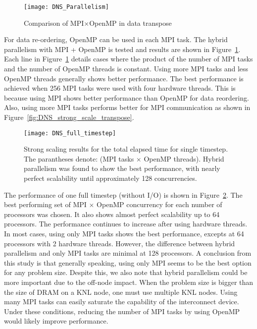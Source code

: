\begin{figure}
 \begin{center}
   \texttt{[image: DNS\_Parallelism]}
   \caption{Comparison of MPI$\times$OpenMP in data transpose}
   \label{fig:DNS_MPI_OpenMP}
 \end{center}
\end{figure}


For data re-ordering, OpenMP can be used in each MPI task. The hybrid parallelism with MPI + OpenMP
is tested and results are shown in Figure~\ref{fig:DNS_MPI_OpenMP}. 
Each line in Figure~\ref{fig:DNS_MPI_OpenMP} details cases where the product of
the number of MPI tasks and the number of OpenMP threads is
constant. Using more MPI tasks and less OpenMP threads generally shows
better performance. The best performance is achieved when 256 MPI tasks
were used with four hardware threads. This is because using MPI shows
better performance than OpenMP for data reordering. Also, using more MPI
tasks performs better for MPI communication as shown in
Figure~\ref{fig:DNS_strong_scale_transpose}. 


\begin{figure}
 \begin{center}
   \texttt{[image: DNS\_full\_timestep]}
   \caption{Strong scaling results for the total elapsed time for single timestep. The parantheses denote: (MPI tasks $\times$ OpenMP threads). Hybrid parallelism was found to show the best performance, with nearly perfect scalability until approximately 128 concurrencies.}
   \label{fig:DNS_strong_scale_total_elapsed_time}
 \end{center}
\end{figure}

The performance of one full timestep (without I/O) is shown in
Figure~\ref{fig:DNS_strong_scale_total_elapsed_time}. The best
performing set of MPI $\times$ OpenMP concurrency for each number of 
processors was chosen. It also shows almost perfect scalability up to 64
processors. The performance continues to increase after using hardware
threads. In most cases, using only MPI tasks shows the best performance, 
excepts at 64 processors with 2 hardware threads. However, the
difference between hybrid parallelism and only MPI tasks are minimal at
128 processors. A conclusion from this study is that generally speaking, 
using only MPI seems to be the best option for any problem size. 
Despite this, we also note that hybrid parallelism could be more 
important due to the off-node impact. When the problem size
is bigger than the size of DRAM on a KNL node, one must use multiple KNL
nodes. Using many MPI tasks can easily saturate the capability of
the interconnect device. Under these conditions, reducing the number of MPI tasks
by using OpenMP would likely improve performance.   

